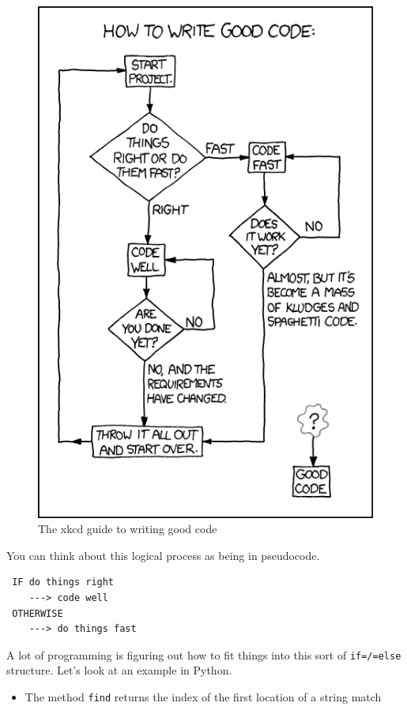 \documentclass[11pt]{article}
\begin{document}
    \begin{figure}[htb]
    \centering
    \includegraphics[width=.9\linewidth]{./img/decision-tree.png}
    \caption{The xkcd guide to writing good code}
    \end{figure}

You can think about this logical process as being in pseudocode.

\begin{verbatim}
 IF do things right
    ---> code well
 OTHERWISE
    ---> do things fast
\end{verbatim}

A lot of programming is figuring out how to fit things into this sort
of \texttt{if=/=else} structure.  Let's look at an example in Python.

\begin{itemize}
\item The method \texttt{find} returns the index of the first location of a
  string match
\end{itemize}
\end{document}
